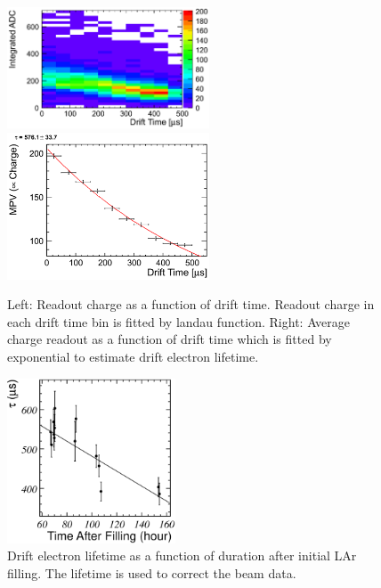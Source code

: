 \begin{figure}[htbp]
 \begin{center}
  \includegraphics[width=60mm]{fig/chargeDep.eps}
  \includegraphics[width=60mm]{fig/tauExample.eps}
 \end{center}
 \caption{Left: Readout charge as a function of drift time. Readout charge in each drift time bin is fitted by landau function. Right: Average charge readout as a function of drift time which is fitted by exponential to estimate drift electron lifetime.}
 \label{fig:tauExample}
\end{figure}


\begin{figure}[htbp]
 \begin{center}
  \includegraphics[width=50mm]{fig/tauHistory.eps}
 \end{center}
 \caption{Drift electron lifetime as a function of duration after initial LAr filling. The lifetime is used to correct the beam data.}
 \label{fig:CosmicPurity}
\end{figure}

